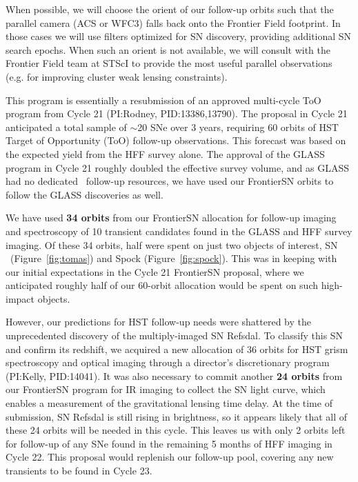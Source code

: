 \documentclass[12pt]{article}
\begin{document}
%
%
\coordinatedobs          %


When possible, we will choose the orient of our follow-up orbits such
that the parallel camera (ACS or WFC3) falls back onto the Frontier
Field footprint.  In those cases we will use filters optimized for SN
discovery, providing additional SN search epochs.  When such an orient
is not available, we will consult with the Frontier Field team at
STScI to provide the most useful parallel observations (e.g. for
improving cluster weak lensing constraints).



%
%
\duplications           %

This program is essentially a resubmission of an approved multi-cycle
ToO program from Cycle 21 (PI:Rodney, PID:13386,13790). The proposal
in Cycle 21 anticipated a total sample of $\sim$20 SNe over 3 years,
requiring 60 orbits of HST Target of Opportunity (ToO) follow-up
observations.  This forecast was based on the expected yield from the
HFF survey alone.  The approval of the GLASS program in Cycle 21
roughly doubled the effective survey volume, and as GLASS had no
dedicated \HST\ follow-up resources, we have used our FrontierSN orbits
to follow the GLASS discoveries as well.

We have used {\bf 34 orbits} from our FrontierSN allocation for follow-up
imaging and spectroscopy of 10 transient candidates found in the GLASS
and HFF survey imaging.  Of these 34 orbits, half were spent on just
two objects of interest, SN \tomas\ (Figure~\ref{fig:tomas}) and Spock
(Figure~\ref{fig:spock}).  This was in keeping with our initial
expectations in the Cycle 21 FrontierSN proposal, where we anticipated
roughly half of our 60-orbit allocation would be spent on such
high-impact objects.

However, our predictions for HST follow-up needs were shattered by the
unprecedented discovery of the multiply-imaged SN Refsdal.  To
classify this SN and confirm its redshift, we acquired a new
allocation of 36 orbits for HST grism spectroscopy and optical imaging
through a director's discretionary program (PI:Kelly, PID:14041).  It
was also necessary to commit another {\bf 24 orbits} from our
FrontierSN program for IR imaging to collect the SN light curve, which
enables a measurement of the gravitational lensing time delay. At the
time of submission, SN Refsdal is still rising in brightness, so it
appears likely that all of these 24 orbits will be needed in this
cycle.  This leaves us with only 2 orbits left for follow-up of any
SNe found in the remaining 5 months of HFF imaging in Cycle 22. This
proposal would replenish our follow-up pool, covering any new
transients to be found in Cycle 23.
\end{document}
